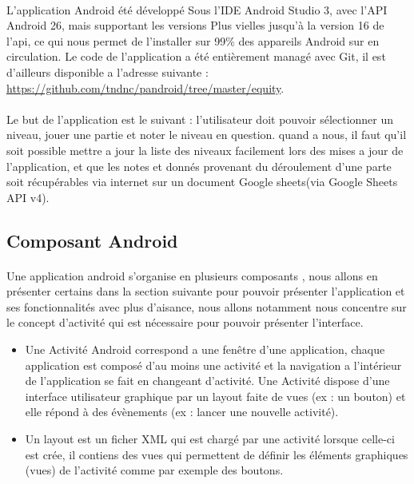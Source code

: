 \documentclass[a4paper, 10pt]{article}
\begin{document}
	\paragraph{}L'application Android  été développé Sous l'IDE Android Studio 3, avec l'API Android 26, mais supportant les versions Plus vielles jusqu'à la version 16 de l'api, ce qui nous permet de l'installer sur 99\% des appareils Android sur en circulation. Le code de l'application a été entièrement managé avec Git, il est d'ailleurs  disponible a l'adresse suivante :  \url{https://github.com/tndnc/pandroid/tree/master/equity}. 
	\paragraph{}Le but de l'application est le suivant : l'utilisateur doit pouvoir sélectionner un niveau, jouer une partie et noter le niveau en question. quand a nous, il faut qu'il soit possible mettre a jour la liste des niveaux facilement lors des mises a jour de l'application, et que les notes et donnés provenant du déroulement d'une parte soit récupérables via internet sur un document Google sheets(via Google Sheets API v4).  
	
	\subsection{Composant Android}
	\paragraph{} Une application android s'organise en plusieurs composants , nous allons en présenter certains dans la section suivante pour pouvoir présenter l'application et ses fonctionnalités avec plus d'aisance, nous allons notamment nous concentre sur le concept d'activité qui est nécessaire pour pouvoir présenter l'interface.
\hfill \break
\begin{itemize}
	\item Une Activité Android correspond a une fenêtre d'une application, chaque application est composé d'au moins une activité et la navigation a l'intérieur de l'application se fait en changeant d'activité. Une Activité dispose d'une interface utilisateur graphique  par un layout faite de vues (ex : un bouton) et elle répond à des évènements (ex : lancer une nouvelle activité).
	\item Un layout est un ficher XML qui est chargé par une activité lorsque celle-ci est crée, il contiens des vues qui permettent de définir les éléments graphiques (vues) de l'activité comme par exemple des boutons.
\end{itemize}
\end{document}

